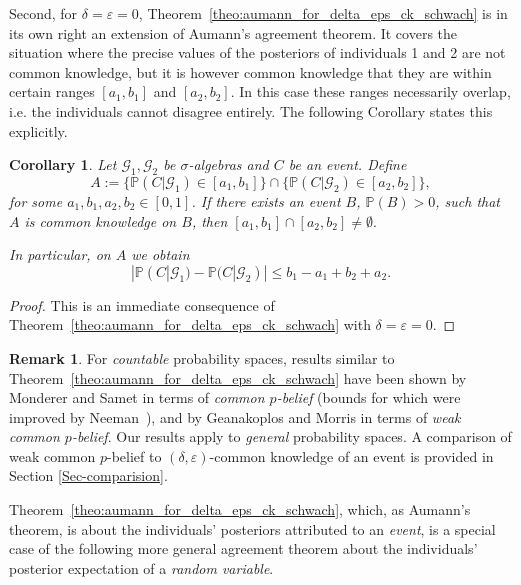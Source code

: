 \documentclass[a4paper, 10pt]{article}
\numberwithin{theorem}{section}
\newtheorem{corollary}[theorem]{Corollary}
\theoremstyle{definition}
\newtheorem{remark}[theorem]{Remark}
\newcommand{\G}{\mathcal{G}}
\renewcommand{\epsilon}{\varepsilon}
\renewcommand{\P}{\mathbb{P}}
\begin{document}
Second, for $\delta=\epsilon=0$, Theorem~\ref{theo:aumann_for_delta_eps_ck_schwach} is in its own right an extension of Aumann’s agreement theorem. It covers the situation where the precise values of the posteriors of individuals 1 and 2 are not common knowledge, but it is however common knowledge that they are within certain ranges $[a_1,b_1]$ and $[a_2,b_2]$. In this case these ranges necessarily overlap, i.e. the individuals cannot disagree entirely. The following Corollary states this explicitly.

\begin{corollary}
    Let $\G_1,\G_2$ be $\sigma$-algebras and $C$ be an event.
    Define
    $$A:= \{\P (C | \G_1) \in [a_1,b_1] \} \cap \{ \P( C| \G_2) \in [a_2,b_2] \},$$
    for some $a_1,b_1,a_2,b_2 \in [0,1]$.
    If there exists an event $B$, $\P(B)>0$, such that $A$ is common knowledge on $B$, then 
    $[a_1,b_1] \cap [a_2,b_2] \neq \emptyset. $
    
    In particular, on $A$ we obtain
    $$|\P(C | \G_1) - \P(C|\G_2)| \leq b_1 -a_1 + b_2 +a_2.$$
\end{corollary}
\begin{proof}
This is an immediate consequence of  Theorem~\ref{theo:aumann_for_delta_eps_ck_schwach} with $\delta=\epsilon=0$.
\end{proof}




\begin{remark}
	
	For \emph{countable} probability spaces, results similar to Theorem~\ref{theo:aumann_for_delta_eps_ck_schwach} have been shown by Monderer and Samet \cite{MoSa89} in terms of \emph{common $p$-belief} (bounds for which were improved by Neeman~\cite{Ne96}), and by Geanakoplos \cite{Ge94} and Morris \cite{Mo99} in terms of \emph{weak common $p$-belief}. Our results apply to \emph{general} probability spaces. A comparison of weak common $p$-belief to $(\delta,\epsilon)$-common knowledge of an event is provided in Section \ref{Sec-comparision}.
\end{remark}


Theorem~\ref{theo:aumann_for_delta_eps_ck_schwach}, which, as Aumann's theorem, is about the individuals' posteriors attributed to an \emph{event}, is a special case of the following more general agreement theorem about the individuals' posterior expectation of a \emph{random variable}.
\end{document}
